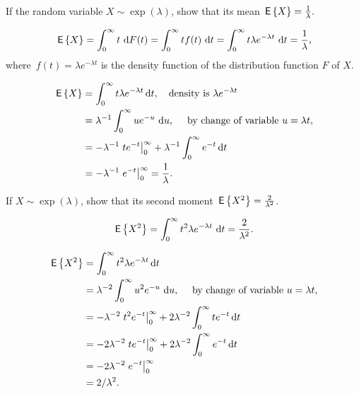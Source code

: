 \begin{exercise} 
  If the random variable $X\sim\exp(\lambda)$, show that its mean $\,\mathsf{E}\left\{X\right\} = \frac{1}\lambda.$
  \begin{hint}
 \begin{equation*}
    \,\mathsf{E}\left\{X\right\} 
= \int_0^\infty t \,\,\text{d}F(t) = \int_0^\infty t f(t)\, \,\text{d}t =
    \int_0^\infty t \lambda e^{-\lambda t}\, \,\text{d}t 
= \frac{1}\lambda,
  \end{equation*}
  where~$f(t)=\lambda e^{-\lambda t}$ is the density function of the distribution function $F$ of $X$.
  \end{hint}
  \begin{solution}
    \begin{equation*}
      \begin{split}
\,\mathsf{E}\left\{X\right\} 
&= \int_0^\infty t \lambda e^{-\lambda t} \,\text{d}t, \quad\text{density is } \lambda e^{-\lambda t} \\
&=   \lambda^{-1} \int_0^\infty u e^{-u}\, \,\text{d}u, \quad \text{ by  change of variable $u=\lambda t$},   \\
&=  -\lambda^{-1}\left. t e^{- t}\right|_0^\infty + \lambda^{-1} \int_0^\infty e^{- t} \,\text{d}t\\
&=  - \lambda^{-1} \left. e^{- t} \right|_0^\infty =  \frac1\lambda.
      \end{split}
    \end{equation*}
  \end{solution}
\end{exercise}


\begin{exercise} 
  If $X\sim\exp(\lambda)$, show that its second moment $\,\mathsf{E}\left\{X^2\right\} =  \frac{2}{\lambda^2}$.
  \begin{hint}
  \begin{equation*}
  \,\mathsf{E}\left\{X^2\right\}= \int_0^\infty t^2 \lambda e^{-\lambda t}\, \,\text{d}t =  \frac{2}{\lambda^2}.
  \end{equation*}
  \end{hint}
  \begin{solution}
    \begin{equation*}
      \begin{split}
\,\mathsf{E}\left\{X^2\right\} 
&= \int_0^\infty t^2 \lambda e^{-\lambda t} \,\text{d}t \\
&=   \lambda^{-2} \int_0^\infty u^2 e^{-u}\, \,\text{d}u, \quad \text{ by  change of variable $u=\lambda t$},   \\
&= -\lambda^{-2}\left. t^2 e^{- t}\right|_0^\infty + 2\lambda^{-2}\int_0^\infty t e^{- t} \,\text{d}t \\
&=  -2\lambda^{-2}\left. t e^{- t}\right|_0^\infty + 2\lambda^{-2} \int_0^\infty e^{- t} \,\text{d}t\\
&=  - 2\lambda^{-2} \left. e^{- t} \right|_0^\infty \\
&=  2/\lambda^2.
      \end{split}
    \end{equation*}
  \end{solution}
\end{exercise}

